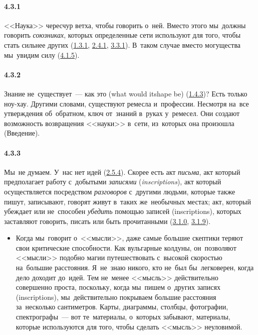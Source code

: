\paragraph{4.3.1}\hypertarget{par:4.3.1}{} <<Наука>> чересчур ветха, чтобы говорить о~ней. Вместо этого мы~должны говорить {\itshape союзниках}, которых определенные сети используют для того, чтобы стать сильнее других (\hyperlink{par:1.3.1}{1.3.1}, \hyperlink{par:2.4.1}{2.4.1}, \hyperlink{par:3.3.1}{3.3.1}). В~таком случае вместо могущества мы~увидим силу (\hyperlink{par:4.1.5}{4.1.5}).


\paragraph{4.3.2}\hypertarget{par:4.3.2}{} Знание не~существует~--- как это (what would itshape be) (\hyperlink{par:1.4.3}{1.4.3})? Есть только ноу-хау. Другими словами, существуют ремесла и~профессии. Несмотря на~все утверждения об~обратном, ключ от~знаний в~руках у~ремесел. Они создают возможность возвращения <<науки>> в~сети, из~которых она произошла (Введение).


\paragraph{4.3.3}\hypertarget{par:4.3.3}{} Мы~не думаем. У~нас нет идей (\hyperlink{par:2.5.4}{2.5.4}). Скорее есть акт {\itshape письма}, акт который предполагает работу с~добытыми {\itshape записями} ({\itshape inscriptions}), акт который осуществляется посредством {\itshape разговоров} с~другими людьми, которые также пишут, записывают, говорят живут в~таких же~необычных местах; акт, который убеждает или не~способен {\itshape убедить} помощью записей (inscriptions), которых заставляют говорить, писать или быть прочитанными (\hyperlink{par:3.1.0}{3.1.0}, \hyperlink{par:3.1.9}{3.1.9}). 
	\begin{itemize}
	\item 
	Когда мы~говорит о~<<мысли>>, даже самые большие скептики теряют свои критические способности. Как вульгарные колдуны, он~позволяют <<мысли>> подобно магии путешествовать с~высокой скоростью на~большие расстояния. Я~не~знаю никого, кто не~был бы~легковерен, когда дело доходит до~идей. Тем не~менее <<мысль>> действительно совершенно проста, поскольку, когда мы~пишем о~других записях (inscriptions), мы~действительно покрываем большие расстояния за~несколько сантиметров. Карты, диаграммы, столбцы, фотографии, спектрографы~--- вот те~материалы, о~которых забывают, материалы, которые используются для того, чтобы сделать <<мысль>> неуловимой.
	\end{itemize}


